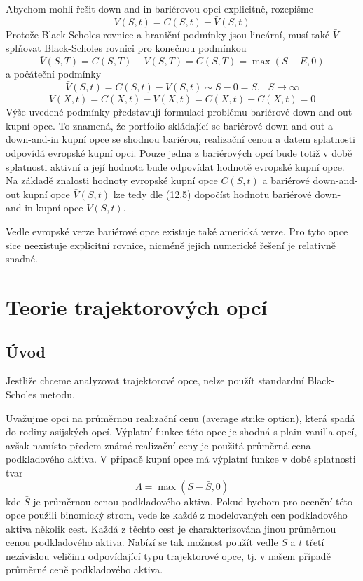\documentclass[a4paper]{book}
\begin{document}
Abychom mohli řešit down-and-in bariérovou opci explicitně, rozepišme
\begin{equation}
V(S, t) = C(S, t) - \bar{V}(S, t)
\end{equation}
Protože Black-Scholes rovnice a hraniční podmínky jsou lineární, musí také $\bar{V}$ splňovat Black-Scholes rovnici pro konečnou podmínkou
\begin{equation*}
\bar{V}(S, T) = C(S,T) - V(S, T) = C(S, T) = \max(S - E, 0)
\end{equation*}
a počáteční podmínky
\begin{equation*}
\bar{V}(S, t) = C(S,t) - V(S, t) \sim S - 0 = S, ~~~ S \rightarrow \infty
\end{equation*}
\begin{equation*}
\bar{V}(X, t) = C(X,t) - V(X, t) = C(X, t) - C(X, t) = 0
\end{equation*}
Výše uvedené podmínky představují formulaci problému bariérové down-and-out kupní opce. To znamená, že portfolio skládající se bariérové down-and-out a down-and-in kupní opce se shodnou bariérou, realizační cenou a datem splatnosti odpovídá evropské kupní opci. Pouze jedna z bariérových opcí bude totiž v době splatnosti aktivní a její hodnota bude odpovídat hodnotě evropské kupní opce. Na základě znalosti hodnoty evropské kupní opce $C(S, t)$ a bariérové down-and-out kupní opce $\bar{V}(S, t)$ lze tedy dle (12.5) dopočíst hodnotu bariérové down-and-in kupní opce $V(S, t)$. 

Vedle evropské verze bariérové opce existuje také americká verze. Pro tyto opce sice neexistuje explicitní rovnice, nicméně jejich numerické řešení je relativně snadné.

\chapter{Teorie trajektorových opcí}

\section{Úvod}

Jestliže chceme analyzovat trajektorové opce, nelze použít standardní Black-Scholes metodu.

Uvažujme opci na průměrnou realizační cenu (average strike option), která spadá do rodiny asijských opcí. Výplatní funkce této opce je shodná s plain-vanilla opcí, avšak namísto předem známé realizační ceny je použitá průměrná cena podkladového aktiva. V případě kupní opce má výplatní funkce v době splatnosti tvar
\begin{equation*}
\Lambda = \max(S - \bar{S}, 0)
\end{equation*}
kde $\bar{S}$ je průměrnou cenou podkladového aktiva. Pokud bychom pro ocenění této opce použili binomický strom, vede ke každé z modelovaných cen podkladového aktiva několik cest. Každá z těchto cest je charakterizována jinou průměrnou cenou podkladového aktiva. Nabízí se tak možnost použít vedle $S$ a $t$ třetí nezávislou veličinu odpovídající typu trajektorové opce, tj. v našem případě průměrné ceně podkladového aktiva.
\end{document}
